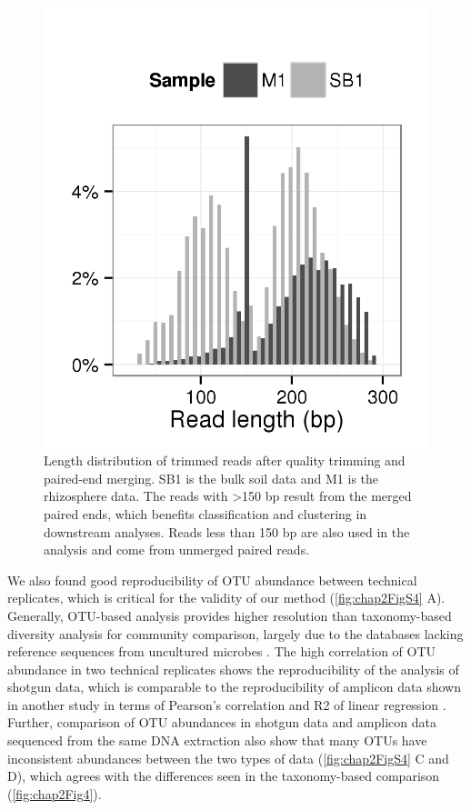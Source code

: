 \documentclass[]{msu-thesis}
\begin{document}
\begin{figure}[tbph!]
  \centering
  \includegraphics[scale=1]{figs/chap2_figS10}
  \caption[Length distribution of trimmed reads after quality trimming and paired-end merging]{Length distribution of trimmed reads after quality trimming and paired-end merging. SB1 is the bulk soil data and M1 is the rhizosphere data. The reads with >150 bp result from the merged paired ends, which benefits classification and clustering in downstream analyses. Reads less than 150 bp are also used in the analysis and come from unmerged paired reads.}
  \label{fig:chap2FigS10}
\end{figure}

We also found good reproducibility of OTU abundance between technical replicates, which is critical for the validity of our method (\cref{fig:chap2FigS4} A). Generally, OTU-based analysis provides higher resolution than taxonomy-based diversity analysis for community comparison, largely due to the databases lacking reference sequences from uncultured microbes \cite{schloss_assessing_2011}. The high correlation of OTU abundance in two technical replicates shows the reproducibility of the analysis of shotgun data, which is comparable to the reproducibility of amplicon data shown in another study in terms of Pearson’s correlation and R2 of linear regression \cite{lundberg_defining_2012}. Further, comparison of OTU abundances in shotgun data and amplicon data sequenced from the same DNA extraction also show that many OTUs have inconsistent abundances between the two types of data (\cref{fig:chap2FigS4} C and D), which agrees with the differences seen in the taxonomy-based comparison (\cref{fig:chap2Fig4}).
\end{document}
